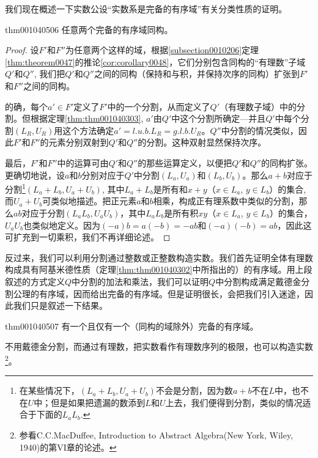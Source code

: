 我们现在概述一下实数公设“实数系是完备的有序域”有关分类性质的证明。

\begin{theorem}{}{thm001040506}
任意两个完备的有序域同构。
\end{theorem}

\begin{proof}
设$F'$和$F''$为任意两个这样的域，根据\ref{subsection0010206}定理\ref{thm:theorem0047}的推论\ref{cor:corollary0048}，它们分别包含同构的“有理数”子域$Q'$和$Q''$, 我们把$Q'$和$Q''$之间的同构（保持和与积，并保持次序的同构）扩张到$F'$和$F''$之间的同构。

的确，每个$a' \in F'$定义了$F'$中的一个分割，从而定义了$Q'$（有理数子域）中的分割。但根据定理\ref{thm:thm001040303}, $a'$由$Q'$中这个分割所确定---并且$Q'$中每个分割$(L_R, U_R)$用这个方法确定$a'=l.u.b.L_R = g.l.b.U_R$。$Q''$中分割的情况类似，因此$F'$和$F''$的元素分别双射到$Q'$和$Q''$的分割。这种双射显然保持次序。

最后，$F'$和$F''$中的运算可由$Q'$和$Q''$的那些运算定义，以便把$Q'$和$Q''$的同构扩张。更确切地说，设$a$和$b$分别对应于$Q'$中分割$(L_a, U_a)$和$(L_b, U_b)$。那么$a+b$对应于分割\footnote{在某些情况下，$(L_a+L_b, U_a+U_b)$不会是分割，因为数$a+b$不在$L$中，也不在$U$中；但是如果把遗漏的数添到$L$和$U$上去，我们便得到分割，类似的情况适合于下面的$L_aL_b$.}$(L_a+L_b, U_a+U_b)$, 其中$L_a+L_b$是所有和$x+y$（$x \in L_a$, $y \in L_b$）的集合, 而$U_a+U_b$可类似地描述。把正元素$a$和$b$相乘，构成正有理系数中类似的分割，那么$ab$对应于分割$(L_aL_b, U_aU_b)$，其中$L_aL_b$是所有积$xy$（$x \in L_a$, $y \in L_b$）的集合，$U_aU_b$也类似地定义。因为$(-a)b=a(-b)=-ab$和$(-a)(-b)=ab$，因此这可扩充到一切乘积，我们不再详细论述。 
\end{proof}

反过来，我们可以利用分割通过整数或正整数构造实数。我们首先证明全体有理数构成具有阿基米德性质（定理\ref{thm:thm001040302}中所指出的）的有序域。用上段叙述的方式定义$Q$中分割的加法和乘法，我们可以证明$Q$中分割构成满足戴德金分割公理的有序域，因而给出完备的有序域。但是证明很长，会把我们引入迷途，因此我们只是叙述一下结果。

\begin{theorem}{}{thm001040507}
有一个且仅有一个（同构的域除外）完备的有序域。
\end{theorem}

不用戴德金分割，而通过有理数，把实数看作有理数序列的极限，也可以构造实数\footnote{参看C.C.MacDuffee, Introduction to Abstract Algebra(New York, Wiley, 1940)的第VI章的论述。}。

